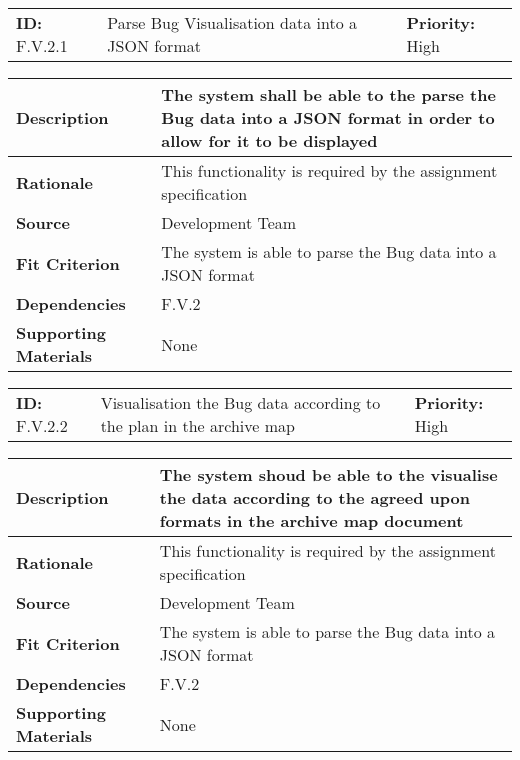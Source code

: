 \begin{table}[H]
    \begin{tabularx}{\textwidth}{| l | X | l |}
        \hline
        \textbf{ID:} F.V.2.1 & Parse Bug Visualisation data into a JSON format & \textbf{Priority:} High \\
    \end{tabularx}
    \begin{tabularx}{\textwidth}{| l | X |}
        \hline
        \textbf{Description} & The system shall be able to the parse the Bug data into a JSON format in order to allow for it to be displayed\\ \hline
        \textbf{Rationale} & This functionality is required by the assignment specification\\ \hline
        \textbf{Source} & Development Team\\ \hline
        \textbf{Fit Criterion} & The system is able to parse the Bug data into a JSON format\\ \hline
        \textbf{Dependencies} & F.V.2 \\ \hline
        \textbf{Supporting Materials} & None \\ \hline
    \end{tabularx}
\end{table}

\begin{table}[H]
    \begin{tabularx}{\textwidth}{| l | X | l |}
        \hline
        \textbf{ID:} F.V.2.2 & Visualisation the Bug data according to the plan in the archive map & \textbf{Priority:} High \\
    \end{tabularx}
    \begin{tabularx}{\textwidth}{| l | X |}
        \hline
        \textbf{Description} & The system shoud be able to the visualise the data according to the agreed upon formats in the archive map document\\ \hline
        \textbf{Rationale} & This functionality is required by the assignment specification\\ \hline
        \textbf{Source} & Development Team\\ \hline
        \textbf{Fit Criterion} & The system is able to parse the Bug data into a JSON format\\ \hline
        \textbf{Dependencies} & F.V.2 \\ \hline
        \textbf{Supporting Materials} & None \\ \hline
    \end{tabularx}
\end{table}

